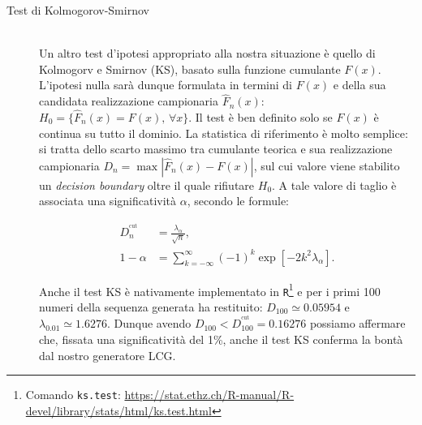 \begin{description}
	\item[\quad\quad\! Test di Kolmogorov-Smirnov]\quad\\
	\noindent Un altro test d'ipotesi appropriato alla nostra situazione è quello di Kolmogorv e Smirnov (KS), basato sulla funzione cumulante $F(x)$. L'ipotesi nulla sarà dunque formulata in termini di $F(x)$ e della sua candidata realizzazione campionaria $\hat{F}_n(x)$: $H_0 = \{\hat{F}_n(x) = F(x), \,\forall x\}$. Il test è ben definito solo se $F(x)$ è continua su tutto il dominio.
	La statistica di riferimento è molto semplice: si tratta dello scarto massimo tra cumulante teorica e sua realizzazione campionaria $D_n = \max |\hat{F}_n(x) - F(x)|$, sul cui valore viene stabilito un \emph{decision boundary} oltre il quale rifiutare $H_0$. A tale valore di taglio è associata una significatività $\alpha$, secondo le formule:
	
	\begin{align*}
	D_n^{^\mathrm{cut}} &= \frac{\lambda_\alpha}{\sqrt{n}},\\
	1-\alpha &= \sum_{k=-\infty}^{\infty} (-1)^k \exp\left[-2k^2\lambda_\alpha\right].
	\end{align*}
	
	\noindent Anche il test KS è nativamente implementato in \texttt{R}\footnote{Comando \texttt{ks.test}: \url{https://stat.ethz.ch/R-manual/R-devel/library/stats/html/ks.test.html}} e per i primi 100 numeri della sequenza generata ha restituito: $D_{100} \simeq 0.05954$ e $\lambda_{0.01} \simeq 1.6276$. Dunque avendo $D_{100} < D_{100}^{^\mathrm{cut}} = 0.16276$ possiamo affermare che, fissata una significatività del 1\%, anche il test KS conferma la bontà dal nostro generatore LCG.

\end{description}

